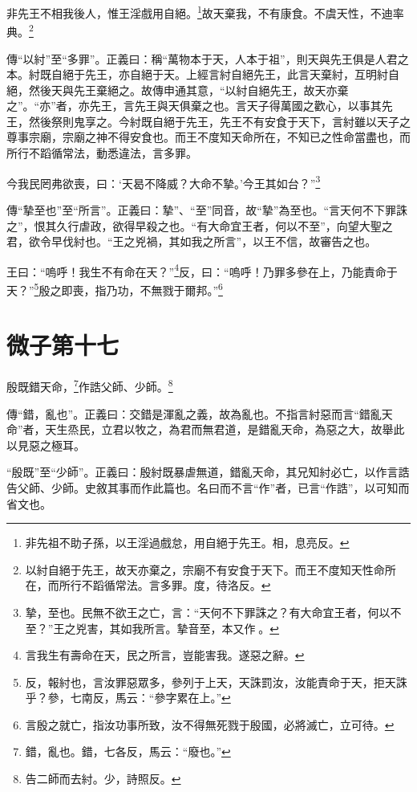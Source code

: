 非先王不相我後人，惟王淫戲用自絕。\footnote{非先祖不助子孫，以王淫過戲怠，用自絕于先王。相，息亮反。}故天棄我，不有康食。不虞天性，不迪率典。\footnote{以紂自絕于先王，故天亦棄之，宗廟不有安食于天下。而王不度知天性命所在，而所行不蹈循常法。言多罪。度，待洛反。}

{\noindent\zhuan{}\fzbyks 傳“以紂”至“多罪”。正義曰：稱“萬物本于天，人本于祖”，則天與先王俱是人君之本。紂既自絕于先王，亦自絕于天。上經言紂自絕先王，此言天棄紂，互明紂自絕，然後天與先王棄絕之。故傳申通其意，“以紂自絕先王，故天亦棄之”。“亦”者，亦先王，言先王與天俱棄之也。言天子得萬國之歡心，以事其先王，然後祭則鬼享之。今紂既自絕于先王，先王不有安食于天下，言紂雖以天子之尊事宗廟，宗廟之神不得安食也。而王不度知天命所在，不知已之性命當盡也，而所行不蹈循常法，動悉違法，言多罪。 \par}

今我民罔弗欲喪，曰：‘天曷不降威？大命不摯。’今王其如台？”\footnote{摯，至也。民無不欲王之亡，言：“天何不下罪誅之？有大命宜王者，何以不至？”王之兇害，其如我所言。摯音至，本又作𡠗。}

{\noindent\zhuan{}\fzbyks 傳“摯至也”至“所言”。正義曰：摯”、“至”同音，故“摯”為至也。“言天何不下罪誅之”，恨其久行虐政，欲得早殺之也。“有大命宜王者，何以不至”，向望大聖之君，欲令早伐紂也。“王之兇禍，其如我之所言”，以王不信，故審告之也。 \par}

王曰：“嗚呼！我生不有命在天？”\footnote{言我生有壽命在天，民之所言，豈能害我。遂惡之辭。}反，曰：“嗚呼！乃罪多參在上，乃能責命于天？”\footnote{反，報紂也，言汝罪惡眾多，參列于上天，天誅罰汝，汝能責命于天，拒天誅乎？參，七南反，馬云：“參字累在上。”}殷之即喪，指乃功，不無戮于爾邦。”\footnote{言殷之就亡，指汝功事所致，汝不得無死戮于殷國，必將滅亡，立可待。}

\section{微子第十七}


殷既錯天命，\footnote{錯，亂也。錯，七各反，馬云：“廢也。”}作誥父師、少師。\footnote{告二師而去紂。少，詩照反。}


{\noindent\zhuan{}\fzbyks 傳“錯，亂也”。正義曰：交錯是渾亂之義，故為亂也。不指言紂惡而言“錯亂天命”者，天生烝民，立君以牧之，為君而無君道，是錯亂天命，為惡之大，故舉此以見惡之極耳。 \par}

{\noindent\shu{}\fzkt “殷既”至“少師”。正義曰：殷紂既暴虐無道，錯亂天命，其兄知紂必亡，以作言誥告父師、少師。史敘其事而作此篇也。名曰而不言“作”者，已言“作誥”，以可知而省文也。 \par}


